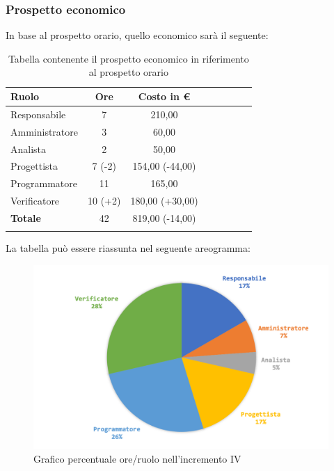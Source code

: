 		\subsubsection{Prospetto economico}
			In base al prospetto orario, quello economico sarà il seguente: 
			
			\begin{longtable}{|l|c|c|c|c|c|c|c|}
				\hline
				\rowcolor{lighter-grayer}
				\textbf{Ruolo} & \textbf{Ore} & \textbf{Costo in €} \\
				\hline
				\endfirsthead
				\hline
				Responsabile 	    & 7 & 210,00\\
				\hline 
				\hline
				Amministratore	  & 3 & 60,00\\
				\hline
				\hline
				Analista 				& 2 & 50,00\\
				\hline
				\hline
				Progettista 		  & 7 (-2) & 154,00 (-44,00)\\
				\hline
				\hline
				Programmatore 	 & 11 & 165,00\\
				\hline
				\hline
				Verificatore 		  & 10 (+2) & 180,00 (+30,00) \\
				\hline
				\textbf{Totale} 	& 42 & 819,00 (-14,00)\\
				\hline
				
				\caption{Tabella contenente il prospetto economico in riferimento al prospetto orario}
			\end{longtable}
		\pagebreak
			
			La tabella può essere riassunta nel seguente areogramma:
			\begin{figure}[H]
				\centering
				\includegraphics[width=0.8\linewidth]{images/consuntivo/ConsIncr4-2.png}
				\caption{Grafico percentuale ore/ruolo nell'incremento IV}
				\label{fig:consuntivo grafico costi ruolo incremento IV}
			\end{figure}
		
